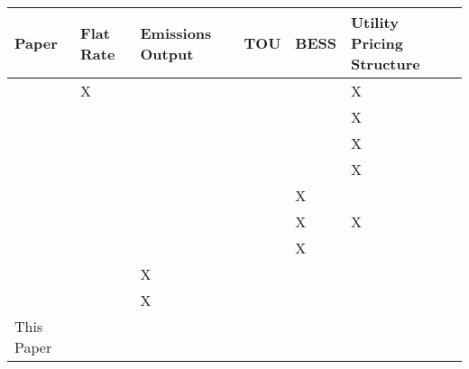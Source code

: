 	\begin{tabularx}{\linewidth}{X | l | l | l | l | l} 
		\hline
		Paper & Flat Rate  &  Emissions Output &  TOU & BESS & Utility Pricing Structure  \\ 
		\hline\hline
		\cite{schedulingcontroller} & X & \checkmark  & \checkmark &  \checkmark  &  X\\ 
		\hline
		\cite{economicandenvironmentalpolicy} & \checkmark & \checkmark & \checkmark & \checkmark & X \\
		\hline
		\cite{stochasticoptimalscheduling} & \checkmark & \checkmark  &  \checkmark & \checkmark & X \\
		\hline
		\cite{emsformg} & \checkmark& \checkmark&  \checkmark  & \checkmark & X \\
		\hline
		\cite{abcdr} & \checkmark &  \checkmark & \checkmark  & X  & \checkmark\\ 
		\hline
		\cite{optimalmmgemissions} & \checkmark& \checkmark&  \checkmark  & X & X \\
		\hline
		\cite{garrido2021dynamic} & \checkmark & \checkmark & \checkmark & X & \checkmark \\ 
		\hline
		\cite{hasan2023universal} & \checkmark & X & \checkmark & \checkmark & \checkmark \\
		\hline
		\cite{enriquez2022microgrid} & \checkmark & X & \checkmark & \checkmark & \checkmark \\
		\hline
		This Paper & \checkmark & \checkmark  & \checkmark &  \checkmark & \checkmark \\ 
		\hline
	\end{tabularx}